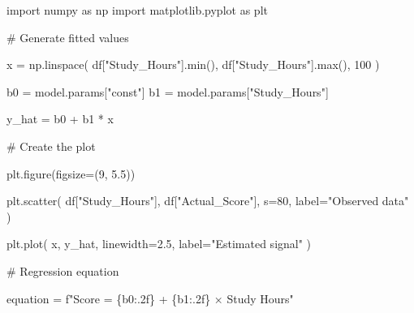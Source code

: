\documentclass[
  a4paper,
]{article}
\newenvironment{Shaded}{\begin{snugshade}}{\end{snugshade}}
\newcommand{\BuiltInTok}[1]{\textcolor[rgb]{0.00,0.23,0.31}{#1}}
\newcommand{\CommentTok}[1]{\textcolor[rgb]{0.37,0.37,0.37}{#1}}
\newcommand{\DecValTok}[1]{\textcolor[rgb]{0.68,0.00,0.00}{#1}}
\newcommand{\FloatTok}[1]{\textcolor[rgb]{0.68,0.00,0.00}{#1}}
\newcommand{\ImportTok}[1]{\textcolor[rgb]{0.00,0.46,0.62}{#1}}
\newcommand{\NormalTok}[1]{\textcolor[rgb]{0.00,0.23,0.31}{#1}}
\newcommand{\OperatorTok}[1]{\textcolor[rgb]{0.37,0.37,0.37}{#1}}
\newcommand{\SpecialCharTok}[1]{\textcolor[rgb]{0.37,0.37,0.37}{#1}}
\newcommand{\SpecialStringTok}[1]{\textcolor[rgb]{0.13,0.47,0.30}{#1}}
\newcommand{\StringTok}[1]{\textcolor[rgb]{0.13,0.47,0.30}{#1}}
\begin{document}
\begin{tcolorbox}[enhanced jigsaw, arc=.35mm, bottomrule=.15mm, bottomtitle=1mm, breakable, colback=white, colbacktitle=quarto-callout-tip-color!10!white, colframe=quarto-callout-tip-color-frame, coltitle=black, left=2mm, leftrule=.75mm, opacityback=0, opacitybacktitle=0.6, rightrule=.15mm, title=\textcolor{quarto-callout-tip-color}{\faLightbulb}\hspace{0.5em}{💻 Coding Session}, titlerule=0mm, toprule=.15mm, toptitle=1mm]

\begin{Shaded}
\begin{Highlighting}[]
\ImportTok{import}\NormalTok{ numpy }\ImportTok{as}\NormalTok{ np}
\ImportTok{import}\NormalTok{ matplotlib.pyplot }\ImportTok{as}\NormalTok{ plt}

\CommentTok{\# Generate fitted values}

\NormalTok{x }\OperatorTok{=}\NormalTok{ np.linspace(}
\NormalTok{    df[}\StringTok{"Study\_Hours"}\NormalTok{].}\BuiltInTok{min}\NormalTok{(),}
\NormalTok{    df[}\StringTok{"Study\_Hours"}\NormalTok{].}\BuiltInTok{max}\NormalTok{(),}
    \DecValTok{100}
\NormalTok{)}

\NormalTok{b0 }\OperatorTok{=}\NormalTok{ model.params[}\StringTok{"const"}\NormalTok{]}
\NormalTok{b1 }\OperatorTok{=}\NormalTok{ model.params[}\StringTok{"Study\_Hours"}\NormalTok{]}

\NormalTok{y\_hat }\OperatorTok{=}\NormalTok{ b0 }\OperatorTok{+}\NormalTok{ b1 }\OperatorTok{*}\NormalTok{ x}

\CommentTok{\# Create the plot}

\NormalTok{plt.figure(figsize}\OperatorTok{=}\NormalTok{(}\DecValTok{9}\NormalTok{, }\FloatTok{5.5}\NormalTok{))}

\NormalTok{plt.scatter(}
\NormalTok{    df[}\StringTok{"Study\_Hours"}\NormalTok{],}
\NormalTok{    df[}\StringTok{"Actual\_Score"}\NormalTok{],}
\NormalTok{    s}\OperatorTok{=}\DecValTok{80}\NormalTok{,}
\NormalTok{    label}\OperatorTok{=}\StringTok{"Observed data"}
\NormalTok{)}

\NormalTok{plt.plot(}
\NormalTok{    x,}
\NormalTok{    y\_hat,}
\NormalTok{    linewidth}\OperatorTok{=}\FloatTok{2.5}\NormalTok{,}
\NormalTok{    label}\OperatorTok{=}\StringTok{"Estimated signal"}
\NormalTok{)}

\CommentTok{\# Regression equation}

\NormalTok{equation }\OperatorTok{=} \SpecialStringTok{f"Score = }\SpecialCharTok{\{}\NormalTok{b0}\SpecialCharTok{:.2f\}}\SpecialStringTok{ + }\SpecialCharTok{\{}\NormalTok{b1}\SpecialCharTok{:.2f\}}\SpecialStringTok{ × Study Hours"}


\end{Highlighting}
\end{Shaded}
\end{tcolorbox}
\end{document}
